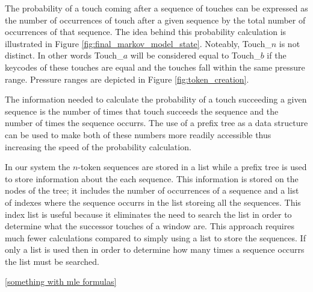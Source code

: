 \documentclass{acm_proc_article-sp}
\begin{document}
The probability of a touch coming after a sequence of touches can be expressed as the number of occurrences of touch after a given sequence by the total number of occurrences of that sequence.
The idea behind this probability calculation is illustrated in Figure \ref{fig:final_markov_model_state}.
Noteably, Touch\_$n$ is not distinct. In other words Touch\_$a$ will be considered equal to Touch\_$b$ if the keycodes of these touches are equal and the touches fall within the same pressure range. Pressure ranges are depicted in Figure \ref{fig:token_creation}.

The information needed to calculate the probability of a touch succeeding a given sequence is the number of times that touch succeeds the sequence and the number of times the sequence occurrs.
The use of a prefix tree as a data structure can be used to make both of these numbers more readily accessible thus increasing the speed of the probability calculation.



In our system the $n$-token sequences are stored in a list while a prefix tree is used to store information about the each sequence.
This information is stored on the nodes of the tree; it includes the number of occurrences of a sequence and a list of indexes where the sequence occurrs in the list storeing all the sequences.
This index list is useful because it eliminates the need to search the list in order to determine what the successor touches of a window are.
This approach requires much fewer calculations compared to simply using a list to store the sequences. 
If only a list is used then in order to determine how many times a sequence occurrs the list must be searched.

\ref{something with mle formulas}


\end{document}
